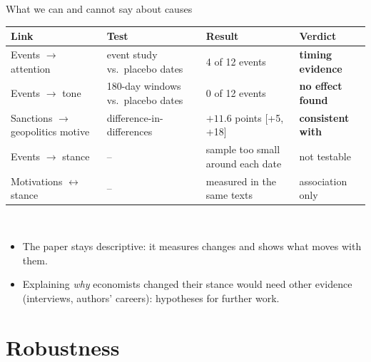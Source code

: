 \documentclass[aspectratio=169,10pt]{beamer}
\begin{document}
\begin{frame}{What we can and cannot say about causes}
\footnotesize
\begin{tabular}{@{}p{}p{}p{}p{}@{}}\toprule
\textbf{Link} & \textbf{Test} & \textbf{Result} & \textbf{Verdict}\\\midrule
Events $\to$ attention & event study vs.\ placebo dates & 4 of 12 events & \textcolor{c6}{\textbf{timing evidence}}\\
Events $\to$ tone & 180-day windows vs.\ placebo dates & 0 of 12 events & \textcolor{c2}{\textbf{no effect found}}\\
Sanctions $\to$ geopolitics motive & difference-in-differences & $+11.6$ points [+5, +18] & \textcolor{c3}{\textbf{consistent with}}\\
Events $\to$ stance & -- & sample too small around each date & not testable\\
Motivations $\leftrightarrow$ stance & -- & measured in the same texts & association only\\
\bottomrule\end{tabular}\\[8pt]
\small
\begin{itemize}\setlength\itemsep{2pt}
\item The paper stays \alert{descriptive}: it measures changes and shows what moves with them.
\item Explaining \emph{why} economists changed their stance would need other evidence (interviews, authors' careers): hypotheses for further work.
\end{itemize}
\end{frame}

\section{Robustness}
\end{document}
